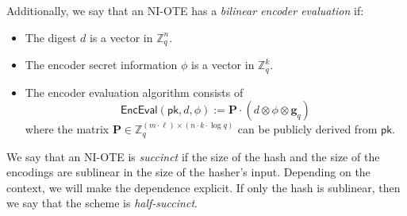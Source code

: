 \documentclass{theoretics}
\newcommand{\Z}{\mathbb{Z}}
\newcommand{\algofont}[1]{\ensuremath{\mathsf{#1}}}
\newcommand{\Enc}{{\algofont{Enc}}}
\newcommand{\Eval}{\algofont{Eval}\xspace}
\newcommand{\pk}{{\mathsf{pk}}}
\begin{document}
Additionally, we say that an NI-OTE has a \emph{bilinear encoder evaluation} if:
\begin{itemize}
    \item The digest $d$ is a vector in $\Z_q^n$.
    \item The encoder secret information $\phi$ is a vector in $\Z_q^k$.
    \item The encoder evaluation algorithm consists of
    \[
    \Enc\Eval(\pk, d, \phi):=\mathbf{P}\cdot(d\otimes \phi\otimes \mathbf{g}_q)
    \]
    where the matrix $\mathbf{P} \in\Z_q^{(m\cdot \ell)\times (n\cdot k\cdot \log q)}$ can be publicly derived from $\pk$.
\end{itemize}
%
We say that an NI-OTE is \emph{succinct} if the size of the hash and the size of the encodings are sublinear in the size of the  hasher's input. Depending on the context, we will make the dependence explicit. If only the hash is sublinear, then we say that the scheme is \emph{half-succinct}.
\end{document}
